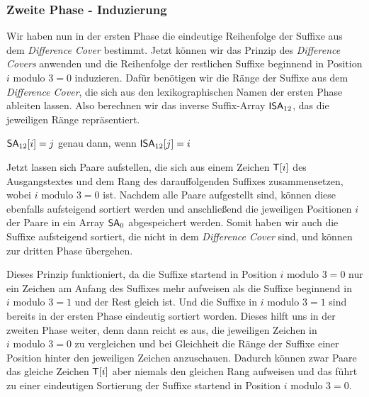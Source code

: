 \subsubsection{Zweite Phase - Induzierung}
\label{dc3:algorithmus:phase2}

Wir haben nun in der ersten Phase die eindeutige Reihenfolge der Suffixe aus dem \emph{Difference Cover} bestimmt. Jetzt können wir das Prinzip des \emph{Difference Covers} anwenden und die Reihenfolge der restlichen Suffixe beginnend in Position $i \text{ modulo } 3 = 0$ induzieren. Dafür benötigen wir die Ränge der Suffixe aus dem \emph{Difference Cover}, die sich aus den lexikographischen Namen der ersten Phase ableiten lassen. Also berechnen wir das inverse Suffix-Array $\isa_{12}$, das die jeweiligen Ränge repräsentiert.
\begin{center}
	$\sa_{12}[i] = j$ genau dann, wenn $\isa_{12}[j] = i$
\end{center}
Jetzt lassen sich Paare aufstellen, die sich aus einem Zeichen $\inputtext[i]$ des Aus\-gangs\-text\-es und dem Rang des darauffolgenden Suffixes zusammensetzen, wobei $i \text{ modulo } 3 = 0$ ist. Nachdem alle Paare aufgestellt sind, können diese ebenfalls aufsteigend sortiert werden und anschließend die jeweiligen Positionen $i$ der Paare in ein Array $\sa_0$ abgespeichert werden. Somit haben wir auch die Suffixe aufsteigend sortiert, die nicht in dem \emph{Difference Cover} sind, und können zur dritten Phase übergehen.

Dieses Prinzip funktioniert, da die Suffixe startend in Position $i \text{ modulo } 3 = 0$ nur ein Zeichen am Anfang des Suffixes mehr aufweisen als die Suffixe beginnend in $i \text{ modulo } 3 = 1$ und der Rest gleich ist. Und die Suffixe in $i \text{ modulo } 3 = 1$ sind bereits in der ersten Phase eindeutig sortiert worden. Dieses hilft uns in der zweiten Phase weiter, denn dann reicht es aus, die jeweiligen Zeichen in $i \text{ modulo } 3 = 0$ zu vergleichen und bei Gleichheit die Ränge der Suffixe einer Position hinter den jeweiligen Zeichen anzuschauen. Dadurch können zwar Paare das gleiche Zeichen $\inputtext[i]$ aber niemals den gleichen Rang aufweisen und das führt zu einer eindeutigen Sortierung der Suffixe startend in Position $i \text{ modulo } 3 = 0$.
